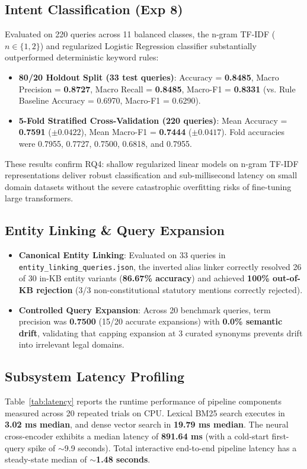 \documentclass[10pt,twocolumn]{article}
\begin{document}
\subsection{Intent Classification (Exp 8)}
Evaluated on 220 queries across 11 balanced classes, the n-gram TF-IDF ($n \in \{1, 2\}$) and regularized Logistic Regression classifier substantially outperformed deterministic keyword rules:
\begin{itemize}[leftmargin=*]
    \item \textbf{80/20 Holdout Split (33 test queries)}: Accuracy = \textbf{0.8485}, Macro Precision = \textbf{0.8727}, Macro Recall = \textbf{0.8485}, Macro-F1 = \textbf{0.8331} (vs. Rule Baseline Accuracy = 0.6970, Macro-F1 = 0.6290).
    \item \textbf{5-Fold Stratified Cross-Validation (220 queries)}: Mean Accuracy = \textbf{0.7591} ($\pm \mathbf{0.0422}$), Mean Macro-F1 = \textbf{0.7444} ($\pm \mathbf{0.0417}$). Fold accuracies were 0.7955, 0.7727, 0.7500, 0.6818, and 0.7955.
\end{itemize}
These results confirm RQ4: shallow regularized linear models on n-gram TF-IDF representations deliver robust classification and sub-millisecond latency on small domain datasets without the severe catastrophic overfitting risks of fine-tuning large transformers.

\subsection{Entity Linking \& Query Expansion}
\begin{itemize}[leftmargin=*]
    \item \textbf{Canonical Entity Linking}: Evaluated on 33 queries in \texttt{entity\_linking\_queries.json}, the inverted alias linker correctly resolved 26 of 30 in-KB entity variants (\textbf{86.67\% accuracy}) and achieved \textbf{100\% out-of-KB rejection} (3/3 non-constitutional statutory mentions correctly rejected).
    \item \textbf{Controlled Query Expansion}: Across 20 benchmark queries, term precision was \textbf{0.7500} (15/20 accurate expansions) with \textbf{0.0\% semantic drift}, validating that capping expansion at 3 curated synonyms prevents drift into irrelevant legal domains.
\end{itemize}

\subsection{Subsystem Latency Profiling}
Table~\ref{tab:latency} reports the runtime performance of pipeline components measured across 20 repeated trials on CPU. Lexical BM25 search executes in \textbf{3.02 ms median}, and dense vector search in \textbf{19.79 ms median}. The neural cross-encoder exhibits a median latency of \textbf{891.64 ms} (with a cold-start first-query spike of $\sim$9.9 seconds). Total interactive end-to-end pipeline latency has a steady-state median of \textbf{$\sim$1.48 seconds}.
\end{document}

